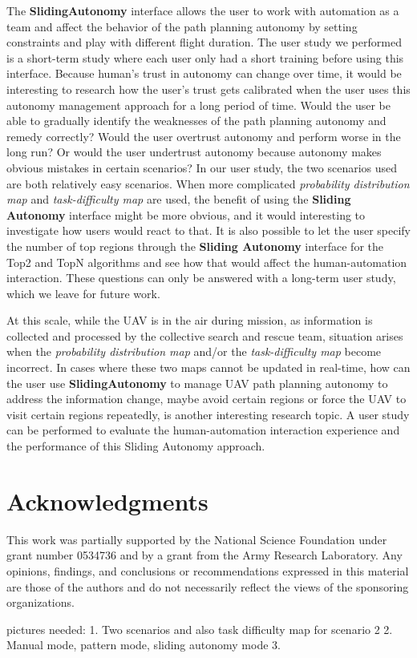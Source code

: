 \documentclass[journal]{IEEEtran}
\begin{document}
The \textbf{SlidingAutonomy} interface allows the user to work with automation as a team and affect the behavior of the path planning autonomy by setting constraints and play with different flight duration. The user study we performed is a short-term study where each user only had a short training before using this interface. Because human's trust in autonomy can change over time, it would be interesting to research how the user's trust gets calibrated when the user uses this autonomy management approach for a long period of time. Would the user be able to gradually identify the weaknesses of the path planning autonomy and remedy correctly? Would the user overtrust autonomy and perform worse in the long run? Or would the user undertrust autonomy because autonomy makes obvious mistakes in certain scenarios? In our user study, the two scenarios used are both relatively easy scenarios. When more complicated \textit{probability distribution map} and \textit{task-difficulty map} are used, the benefit of using the \textbf{Sliding Autonomy} interface might be more obvious, and it would interesting to investigate how users would react to that. It is also possible to let the user specify the number of top regions through the \textbf{Sliding Autonomy} interface for the Top2 and TopN algorithms and see how that would affect the human-automation interaction. These questions can only be answered with a long-term user study, which we leave for future work.

At this scale, while the UAV is in the air during mission, as information is collected and processed by the collective search and rescue team, situation arises when the \textit{probability distribution map} and/or the \textit{task-difficulty map} become incorrect. In cases where these two maps cannot be updated in real-time, how can the user use \textbf{SlidingAutonomy} to manage UAV path planning autonomy to address the information change, maybe avoid certain regions or force the UAV to visit certain regions repeatedly, is another interesting research topic. A user study can be performed to evaluate the human-automation interaction experience and the performance of this Sliding Autonomy approach.



\section*{Acknowledgments}

This work was partially supported by 
the National Science Foundation 
under grant number 
0534736 
and by a grant from
the Army Research Laboratory.
Any opinions, findings, and conclusions or recommendations expressed in this material are those of the authors and do not necessarily reflect the views of the sponsoring organizations.






pictures needed:
1. Two scenarios and also task difficulty map for scenario 2
2. Manual mode, pattern mode, sliding autonomy mode
3. 
\end{document}
